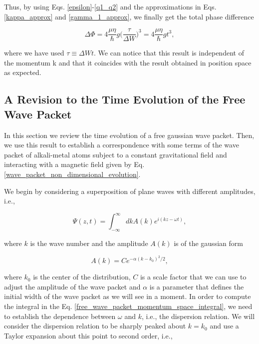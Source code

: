 \documentclass{article}
\begin{document}
Thus, by using Eqs. \ref{epsilon}-\ref{q1_q2} and the approximations in Eqs. \ref{kappa_approx} and \ref{gamma_1_approx}, we finally get the total phase difference

\begin{equation}\label{quantum_gravimetry_signal_momentum_space}
\Delta \Phi = 4 \frac{\mu \eta }{\hbar} g \bigg(\frac{\tau}{\Delta W}\bigg)^{3} = 4 \frac{\mu \eta }{\hbar} g t^{3},
\end{equation}

where we have used $\tau\equiv \Delta W t$. We can notice that this result is independent of the momentum k and that it coincides with the result obtained in position space as expected.

\subsection{A Revision to the Time Evolution of the Free Wave Packet}
In this section we review the time evolution of a free gaussian wave packet. Then, we use this result to establish a correspondence with some terms of the wave packet of alkali-metal atoms subject to a constant gravitational field and interacting with a magnetic field given by Eq. \ref{wave_packet_non_dimensional_evolution}.

We begin by considering a superposition of plane waves with different amplitudes, i.e.,

\begin{equation}\label{free_wave_packet_momentum_space_integral}
    \Psi (z, t) =  \int_{- \infty}^{\infty} dk A(k) e^{i (kz-\omega t)} ,
\end{equation}

where $k$ is the wave number and the amplitude $A(k)$ is of the gaussian form

\begin{equation}\label{gaussian_amplitude_free_wave_packet}
    A(k) = C e^{-\alpha(k-k_{0})^{2}/2} ,
\end{equation}

where $k_{0}$ is the center of the distribution, $C$ is a scale factor that we can use to adjust the amplitude of the wave packet and $\alpha$ is a parameter that defines the initial width of the wave packet as we will see in a moment. In order to compute the integral in the Eq. \ref{free_wave_packet_momentum_space_integral}, we need to establish the dependence between $\omega$ and $k$, i.e., the dispersion relation. We will consider the dispersion relation to be sharply peaked about $k=k_{0}$ and use a Taylor expansion about this point to second order, i.e.,
\end{document}

